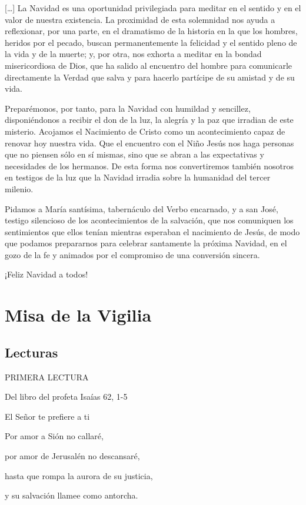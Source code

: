 {[}\ldots{}{]} La Navidad es una oportunidad privilegiada para meditar en el sentido y en el valor de nuestra existencia. La proximidad de esta solemnidad nos ayuda a reflexionar, por una parte, en el dramatismo de la historia en la que los hombres, heridos por el pecado, buscan permanentemente la felicidad y el sentido pleno de la vida y de la muerte; y, por otra, nos exhorta a meditar en la bondad misericordiosa de Dios, que ha salido al encuentro del hombre para comunicarle directamente la Verdad que salva y para hacerlo partícipe de su amistad y de su vida.

Preparémonos, por tanto, para la Navidad con humildad y sencillez, disponiéndonos a recibir el don de la luz, la alegría y la paz que irradian de este misterio. Acojamos el Nacimiento de Cristo como un acontecimiento capaz de renovar hoy nuestra vida. Que el encuentro con el Niño Jesús nos haga personas que no piensen sólo en sí mismas, sino que se abran a las expectativas y necesidades de los hermanos. De esta forma nos convertiremos también nosotros en testigos de la luz que la Navidad irradia sobre la humanidad del tercer milenio.

Pidamos a María santísima, tabernáculo del Verbo encarnado, y a san José, testigo silencioso de los acontecimientos de la salvación, que nos comuniquen los sentimientos que ellos tenían mientras esperaban el nacimiento de Jesús, de modo que podamos prepararnos para celebrar santamente la próxima Navidad, en el gozo de la fe y animados por el compromiso de una conversión sincera.

¡Feliz Navidad a todos!

\chapter{Misa de la Vigilia}

\section{Lecturas}

PRIMERA LECTURA

Del libro del profeta Isaías 62, 1-5

El Señor te prefiere a ti

Por amor a Sión no callaré,

por amor de Jerusalén no descansaré,

hasta que rompa la aurora de su justicia,

y su salvación llamee como antorcha.

